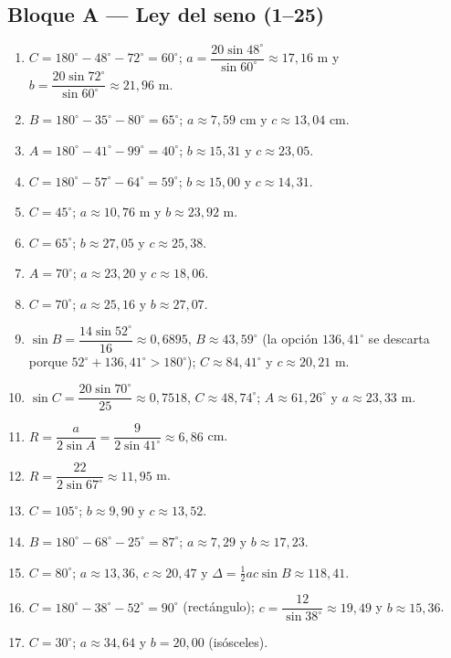 \documentclass[12pt, letterpaper]{article}
\providecommand{\sen}{\sin}
\begin{document}
\subsection*{Bloque A — Ley del seno (1--25)}
\begin{enumerate}[leftmargin=*, label=\textbf{\arabic*.}]
  \item $C=180^\circ-48^\circ-72^\circ=60^\circ$; $a=\dfrac{20\sen 48^\circ}{\sen 60^\circ}\approx 17{,}16$ m y $b=\dfrac{20\sen 72^\circ}{\sen 60^\circ}\approx 21{,}96$ m.
  \item $B=180^\circ-35^\circ-80^\circ=65^\circ$; $a\approx 7{,}59$ cm y $c\approx 13{,}04$ cm.
  \item $A=180^\circ-41^\circ-99^\circ=40^\circ$; $b\approx 15{,}31$ y $c\approx 23{,}05$.
  \item $C=180^\circ-57^\circ-64^\circ=59^\circ$; $b\approx 15{,}00$ y $c\approx 14{,}31$.
  \item $C=45^\circ$; $a\approx 10{,}76$ m y $b\approx 23{,}92$ m.
  \item $C=65^\circ$; $b\approx 27{,}05$ y $c\approx 25{,}38$.
  \item $A=70^\circ$; $a\approx 23{,}20$ y $c\approx 18{,}06$.
  \item $C=70^\circ$; $a\approx 25{,}16$ y $b\approx 27{,}07$.
  \item $\sen B=\dfrac{14\sen 52^\circ}{16}\approx 0{,}6895$, $B\approx 43{,}59^\circ$ (la opción $136{,}41^\circ$ se descarta porque $52^\circ+136{,}41^\circ>180^\circ$); $C\approx 84{,}41^\circ$ y $c\approx 20{,}21$ m.
  \item $\sen C=\dfrac{20\sen 70^\circ}{25}\approx 0{,}7518$, $C\approx 48{,}74^\circ$; $A\approx 61{,}26^\circ$ y $a\approx 23{,}33$ m.
  \item $R=\dfrac{a}{2\sen A}=\dfrac{9}{2\sen 41^\circ}\approx 6{,}86$ cm.
  \item $R=\dfrac{22}{2\sen 67^\circ}\approx 11{,}95$ m.
  \item $C=105^\circ$; $b\approx 9{,}90$ y $c\approx 13{,}52$.
  \item $B=180^\circ-68^\circ-25^\circ=87^\circ$; $a\approx 7{,}29$ y $b\approx 17{,}23$.
  \item $C=80^\circ$; $a\approx 13{,}36$, $c\approx 20{,}47$ y $\Delta=\tfrac12 ac\sen B\approx 118{,}41$.
  \item $C=180^\circ-38^\circ-52^\circ=90^\circ$ (rectángulo); $c=\dfrac{12}{\sen 38^\circ}\approx 19{,}49$ y $b\approx 15{,}36$.
  \item $C=30^\circ$; $a\approx 34{,}64$ y $b=20{,}00$ (isósceles).

\end{enumerate}
\end{document}
